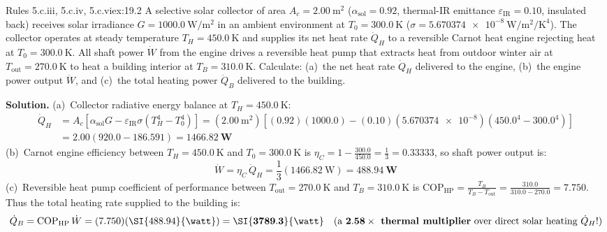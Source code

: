\begin{workedexample}{Rules 5.c.iii, 5.c.iv, 5.c.vi}{ex:19.2}
A selective solar collector of area $A_c = \SI{2.00}{\square\meter}$ ($\alpha_{\mathrm{sol}} = 0.92$, thermal-IR emittance $\varepsilon_{\mathrm{IR}} = 0.10$, insulated back) receives solar irradiance $G = \SI{1000.0}{\watt\per\square\meter}$ in an ambient environment at $T_0 = \SI{300.0}{\kelvin}$ ($\sigma = \SI{5.670374e-8}{\watt\per\square\meter\per\kelvin\tothe{4}}$). The collector operates at steady temperature $T_H = \SI{450.0}{\kelvin}$ and supplies its net heat rate $\dot{Q}_H$ to a reversible Carnot heat engine rejecting heat at $T_0 = \SI{300.0}{\kelvin}$. All shaft power $\dot{W}$ from the engine drives a reversible heat pump that extracts heat from outdoor winter air at $T_{\mathrm{out}} = \SI{270.0}{\kelvin}$ to heat a building interior at $T_B = \SI{310.0}{\kelvin}$. Calculate: (a)~the net heat rate $\dot{Q}_H$ delivered to the engine, (b)~the engine power output $\dot{W}$, and (c)~the total heating power $\dot{Q}_B$ delivered to the building.
\par\smallskip\noindent
\textbf{Solution.}
(a)~Collector radiative energy balance at $T_H = \SI{450.0}{\kelvin}$:
\begin{align*}
  \dot{Q}_H &= A_c\left[\alpha_{\mathrm{sol}} G - \varepsilon_{\mathrm{IR}}\sigma\left(T_H^4 - T_0^4\right)\right] = (\SI{2.00}{\square\meter})\left[(0.92)(1000.0) - (0.10)(\num{5.670374e-8})\left(450.0^4 - 300.0^4\right)\right] \\
            &= 2.00\left(920.0 - 186.591\right) = \mathbf{\SI{1466.82}{\watt}}
\end{align*}
(b)~Carnot engine efficiency between $T_H = \SI{450.0}{\kelvin}$ and $T_0 = \SI{300.0}{\kelvin}$ is $\eta_C = 1 - \frac{300.0}{450.0} = \frac{1}{3} = 0.33333$, so shaft power output is:
$$\dot{W} = \eta_C\,\dot{Q}_H = \frac{1}{3}(\SI{1466.82}{\watt}) = \mathbf{\SI{488.94}{\watt}}$$
(c)~Reversible heat pump coefficient of performance between $T_{\mathrm{out}} = \SI{270.0}{\kelvin}$ and $T_B = \SI{310.0}{\kelvin}$ is $\mathrm{COP}_{\mathrm{HP}} = \frac{T_B}{T_B - T_{\mathrm{out}}} = \frac{310.0}{310.0 - 270.0} = \mathbf{7.750}$. Thus the total heating rate supplied to the building is:
$$\dot{Q}_B = \mathrm{COP}_{\mathrm{HP}}\,\dot{W} = (7.750)(\SI{488.94}{\watt}) = \mathbf{\SI{3789.3}{\watt}} \quad (\text{a }\mathbf{2.58\times\text{\textbf{ thermal multiplier}}} \text{ over direct solar heating }\dot{Q}_H\text{!})$$
\end{workedexample}

